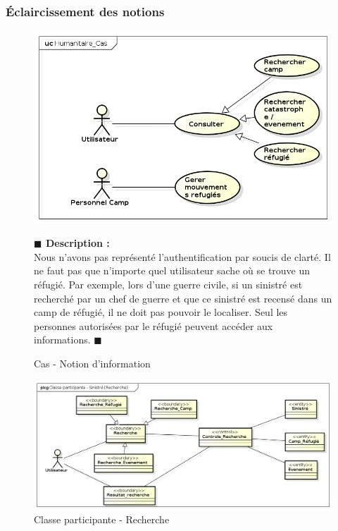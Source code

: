 \documentclass[11pt, titlepage]{report}
\newcommand{\debutDescription}{\noindent\textbf{\textcolor{DescriptionColor}{$\blacksquare$  Description : \\}}}
\newcommand{\finDescription}{\noindent\textcolor{DescriptionColor}{$\blacksquare$}}
\begin{document}
\subsubsection{Éclaircissement des notions}
\begin{figure}[h!]
\begin{center}
\includegraphics[scale=.4]{../images/diagrammes/uml/exigence_1/cas_information_refugie.png} 
\caption{Cas - Notion d'information}
\end{center}
\debutDescription
Nous n'avons pas représenté l'authentification par soucis de clarté. Il ne faut pas que n'importe quel utilisateur sache où se trouve un réfugié. Par exemple, lors d'une guerre civile, si un sinistré est recherché par un chef de guerre et que ce sinistré est recensé dans un camp de réfugié, il ne doit pas pouvoir le localiser. Seul les personnes autorisées par le réfugié peuvent accéder aux informations.
\finDescription
\end{figure}


\begin{figure}[h!]
\begin{center}
\includegraphics[scale=.4]{../images/diagrammes/uml/exigence_1/class_part_recherche.png} 
\caption{Classe participante - Recherche}
\end{center}
\end{figure}
\end{document}
